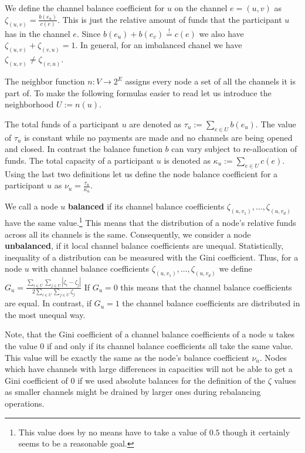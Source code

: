 \documentclass[conference]{IEEEtran}
\begin{document}
We define the channel balance coefficient for $u$ on the channel $e=(u,v)$ as  $\zeta_{(u,v)} = \frac{b(e_u)}{c(e)}$.
This is just the relative amount of funds that the participant $u$ has in the channel $e$.
Since $b(e_u)+b(e_v)\stackrel{!}{=}c(e)$ we also have $\zeta_{(u,v)} + \zeta_{(v,u)}=1$.
In general, for an imbalanced chanel we have $\zeta_{(u,v)} \neq \zeta_{(v,u)}$.

The neighbor function $n : V \longrightarrow 2^{E}$ assigns every node a set of all the channels it is part of.
To make the following formulas easier to read let us introduce the neighborhood $U:=n(u)$.

The total funds of a participant $u$ are denoted as $\tau_u:=\displaystyle{\sum_{e\in U}b(e_u)}$.
The value of $\tau_u$ is constant while no payments are made and no channels are being opened and closed.
In contrast the balance function $b$ can vary subject to re-allocation of funds.
The total capacity of a participant $u$ is denoted as $\kappa_u:=\displaystyle{\sum_{e\in U}c(e)}$.
Using the last two definitions let us define the node balance coefficient for a participant $u$ as $\nu_u = \frac{\tau_u}{\kappa_u}$.

We call a node $u$ {\bf balanced} if its channel balance coefficients $\zeta_{(u,v_1)},\dots,\zeta_{(u,v_d)}$ have the same value.\footnote{This value does by no means have to take a value of $0.5$ though it certainly seems to be a reasonable goal.}
This means that the distribution of a node's relative funds across all its channels is the same.
Consequently, we consider a node {\bf unbalanced}, if it local channel balance coefficients are unequal.
Statistically, inequality of a distribution can be measured with the Gini coefficient.
Thus, for a node $u$ with channel balance coefficients $\zeta_{(u,v_1)},\dots,\zeta_{(u,v_d)}$ we define $G_u = \frac{\displaystyle{\sum_{i\in U} \sum_{j \in U}} | \zeta_i - \zeta_j |}{2 \displaystyle{\sum_{i \in U} \sum_{j \in U} \zeta_j}}$
If $G_u = 0$ this means that the channel balance coefficients are equal.
In contrast, if $G_u = 1$ the channel balance coefficients are distributed in the most unequal way.

Note, that the Gini coefficient of a channel balance coefficients of a node $u$ takes the value $0$ if and only if its channel balance coefficients all take the same value.
This value will be exactly the same as the node's balance coefficient $\nu_u$.
Nodes which have channels with large differences in capacities will not be able to get a Gini coefficient of $0$ if we used absolute balances for the definition of the $\zeta$ values as smaller channels might be drained by larger ones during rebalancing operations.
\end{document}
